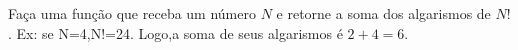 
\question[10]

Faça uma função que receba um número $N$ e retorne a soma dos algarismos de $N!$. Ex: se N=4,N!=24. Logo,a soma de seus algarismos é $2+4=6$.